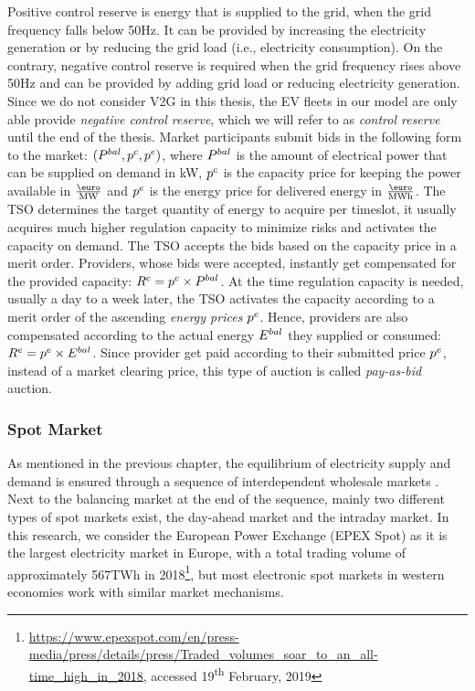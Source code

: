 \documentclass[a4paper, 12pt]{article}
\let\cite\shortcite
\begin{document}
Positive control reserve is energy that is supplied to the grid, when the grid
frequency falls below 50Hz. It can be provided by increasing the electricity
generation or by reducing the grid load (i.e., electricity consumption). On the
contrary, negative control reserve is required when the grid frequency rises
above 50Hz and can be provided by adding grid load or reducing electricity
generation. Since we do not consider V2G in this thesis, the EV fleets in our
model are only able provide \emph{negative control reserve}, which we will refer to
as \emph{control reserve} until the end of the thesis. Market participants submit
bids in the following form to the market: \((P^{bal}_{}, p^c_{}, p^e_{})\), where \(P^{bal}_{}\)
is the amount of electrical power that can be supplied on demand in kW, \(p^c_{}\) is
the capacity price for keeping the power available in \(\emw\) and
\(p^e_{}\) is the energy price for delivered energy in \(\emwh\). The TSO
determines the target quantity of energy to acquire per timeslot, it usually
acquires much higher regulation capacity to minimize risks and activates the
capacity on demand. The TSO accepts the bids based on the capacity price in a
merit order. Providers, whose bids were accepted, instantly get compensated for
the provided capacity: \(R^c = p^c_{} \times P^{bal}_{}\). At the time regulation
capacity is needed, usually a day to a week later, the TSO activates the
capacity according to a merit order of the ascending \emph{energy prices} \(p^e_{}\).
Hence, providers are also compensated according to the actual energy \(E^{bal}_{}\)
they supplied or consumed: \(R^e = p^e_{} \times E^{bal}_{}\). Since provider get paid
according to their submitted price \(p^e_{}\), instead of a market clearing price,
this type of auction is called \emph{pay-as-bid} auction.
\subsubsection{Spot Market \label{sec-spot-market}}
\label{sec:org0989868}
As mentioned in the previous chapter, the equilibrium of electricity supply and
demand is ensured through a sequence of interdependent wholesale markets
\cite{pape16_are_fundam_enoug}. Next to the balancing market at the end of the
sequence, mainly two different types of spot markets exist, the day-ahead market
and the intraday market. In this research, we consider the European Power
Exchange (EPEX Spot) as it is the largest electricity market in Europe, with a
total trading volume of approximately 567TWh in 2018\footnote{\url{https://www.epexspot.com/en/press-media/press/details/press/Traded\_volumes\_soar\_to\_an\_all-time\_high\_in\_2018},
accessed 19\textsuperscript{th} February, 2019\label{org224aae7}}, but most electronic
spot markets in western economies work with similar market mechanisms.
\end{document}
